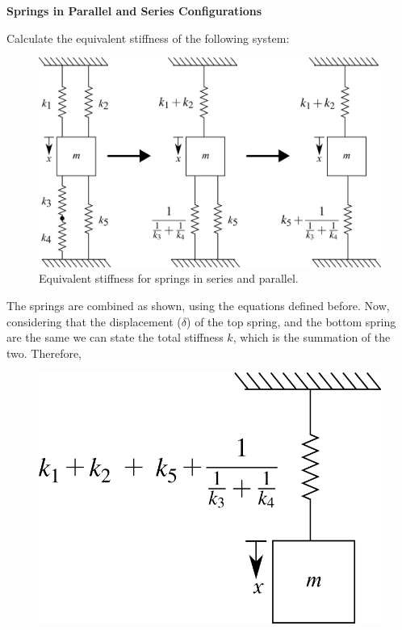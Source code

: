 \documentclass[12pt,letter]{article}
\begin{document}
			\begin{example}

			\textbf{Springs in Parallel and Series Configurations}

			\noindent Calculate the equivalent stiffness of the following system:
				\begin{figure}[H]
					\centering
					\includegraphics[]{../figures/equivalent_mass_and_spring_system_1}
					\caption{Equivalent stiffness for springs in series and parallel.}
				\end{figure}	
				The springs are combined as shown, using the equations defined before.  Now, considering that the displacement ($\delta$) of the top spring, and the bottom spring are the same we can state the total stiffness $k$, which is the summation of the two. Therefore,    
				\begin{figure}[H]
					\centering
					\includegraphics[]{../figures/equivalent_mass_and_spring_system_2}

\end{figure}
\end{example}
\end{document}
